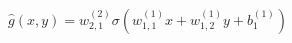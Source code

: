 \documentclass[preview]{standalone}
\begin{document}
\begin{align*}
\hat{g}(x,y) =  w_{2,1}^{(2)} \sigma(w_{1,1}^{(1)}x + w_{1,2}^{(1)}y +b_1^{(1)})
\end{align*}
\end{document}
